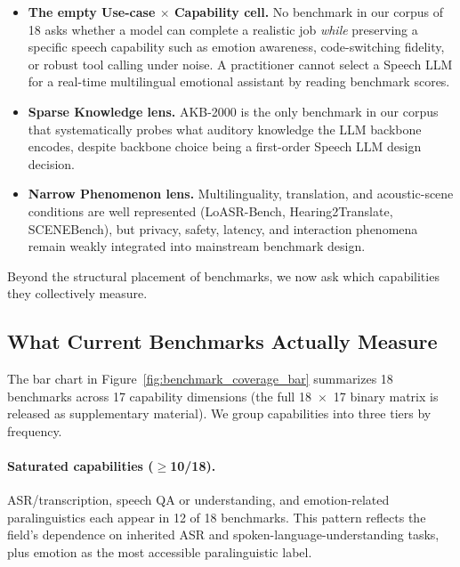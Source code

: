 \begin{itemize}
  \item \textbf{The empty Use-case $\times$ Capability cell.} No benchmark
  in our corpus of 18 asks whether a model can complete a realistic job
  \emph{while} preserving a specific speech capability such as emotion
  awareness, code-switching fidelity, or robust tool calling under
  noise. A practitioner cannot select a Speech LLM for a real-time
  multilingual emotional assistant by reading benchmark scores.
  \item \textbf{Sparse Knowledge lens.} AKB-2000 \citep{lu2026akb2000} is
  the only benchmark in our corpus that systematically probes what
  auditory knowledge the LLM backbone encodes, despite backbone choice
  being a first-order Speech LLM design decision.
  \item \textbf{Narrow Phenomenon lens.} Multilinguality, translation, and
  acoustic-scene conditions are well represented (LoASR-Bench,
  Hearing2Translate, SCENEBench), but privacy, safety, latency, and
  interaction phenomena remain weakly integrated into mainstream
  benchmark design.
\end{itemize}

Beyond the structural placement of benchmarks, we now ask which
capabilities they collectively measure.

\subsection{What Current Benchmarks Actually Measure}
\label{subsec:eval_coverage}

The bar chart in Figure~\ref{fig:benchmark_coverage_bar} summarizes 18
benchmarks across 17 capability dimensions (the full 18~$\times$~17
binary matrix is released as supplementary material). We group
capabilities into three tiers by frequency.

\paragraph{Saturated capabilities ($\geq$10/18).}
ASR/transcription, speech QA or understanding, and emotion-related
paralinguistics each appear in 12 of 18 benchmarks. This pattern reflects
the field's dependence on inherited ASR and spoken-language-understanding
tasks, plus emotion as the most accessible paralinguistic label.

